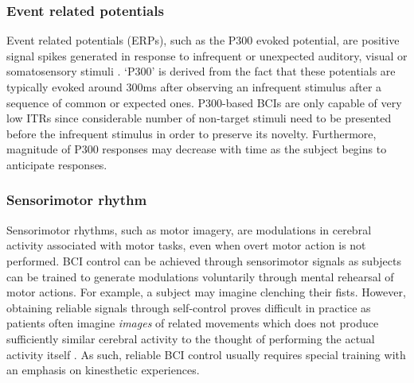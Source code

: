 \subsubsection{Event related potentials}
Event related potentials (ERPs), such as the P300 evoked potential, are positive signal spikes generated in response to infrequent or unexpected auditory, visual or somatosensory stimuli \cite{bci-survey-nicolas-alonso}. `P300' is derived from the fact that these potentials are typically evoked around 300ms after observing an infrequent stimulus after a sequence of common or expected ones. P300-based BCIs are only capable of very low ITRs since considerable number of non-target stimuli need to be presented before the infrequent stimulus in order to preserve its novelty. Furthermore, magnitude of P300 responses may decrease with time as the subject begins to anticipate responses. 

\subsubsection{Sensorimotor rhythm}
Sensorimotor rhythms, such as motor imagery, are modulations in cerebral activity associated with motor tasks, even when overt motor action is not performed. BCI control can be achieved through sensorimotor signals as subjects can be trained to generate modulations voluntarily through mental rehearsal of motor actions. For example, a subject may imagine clenching their fists. However, obtaining reliable signals through self-control proves difficult in practice as patients often imagine \textit{images} of related movements which does not produce sufficiently similar cerebral activity to the thought of performing the actual activity itself \cite{bci-survey-nicolas-alonso}. As such, reliable BCI control usually requires special training with an emphasis on kinesthetic experiences.

